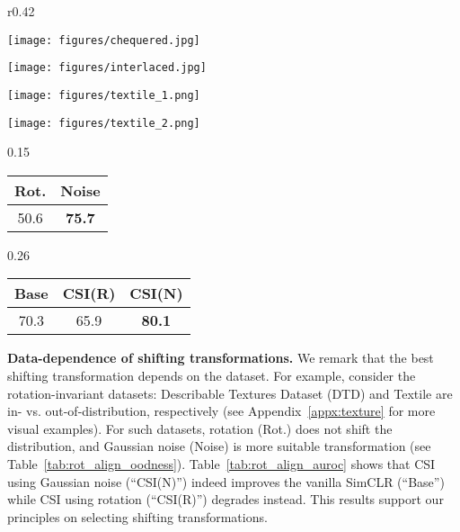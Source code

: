 \documentclass{article}
\begin{document}
\begin{wraptable}[11]{r}{0.42\textwidth}
\vspace{-0.18in}
\centering\small
\caption{OOD-ness (\%) and AUROC (\%) on DTD, where Textile is used for OOD.}\vspace{-0.03in}
\label{tab:rot_align}
\begin{minipage}{0.1\textwidth}
\texttt{[image: figures/chequered.jpg]}
\end{minipage}
\begin{minipage}{0.1\textwidth}
\texttt{[image: figures/interlaced.jpg]}
\end{minipage}
\begin{minipage}{0.1\textwidth}
\texttt{[image: figures/textile\_1.png]}
\end{minipage}
\begin{minipage}{0.1\textwidth}
\texttt{[image: figures/textile\_2.png]}
\end{minipage}
\setlength{\tabcolsep}{5pt}\begin{subtable}{0.15\textwidth}
\centering\small
\vspace{0.08in}
\caption{OOD-ness}\label{tab:rot_align_oodness}
\vspace{-0.07in}
\begin{tabular}{cc}
\toprule
Rot. & Noise \\
\midrule
50.6 & \textbf{75.7} \\
\bottomrule
\end{tabular}
\end{subtable}
\begin{subtable}{0.26\textwidth}
\centering\small
\vspace{0.08in}
\caption{AUROC}\label{tab:rot_align_auroc}
\vspace{-0.07in}
\begin{tabular}{ccc}
\toprule
Base & CSI(R) & CSI(N) \\
\midrule
70.3 & 65.9 & \textbf{80.1} \\
\bottomrule
\end{tabular}
\end{subtable}\end{wraptable}
 
\textbf{Data-dependence of shifting transformations.}
We remark that the best shifting transformation depends on the dataset. For example, consider the rotation-invariant datasets: Describable Textures Dataset (DTD) \citep{cimpoi2014describing} and Textile \citep{schulz1996tilda} are in- vs. out-of-distribution, respectively (see Appendix~\ref{appx:texture} for more visual examples). For such datasets, rotation (Rot.) does not shift the distribution, and Gaussian noise (Noise) is more suitable transformation (see Table~\ref{tab:rot_align_oodness}). Table~\ref{tab:rot_align_auroc} shows that CSI using Gaussian noise (``CSI(N)'') indeed improves the vanilla SimCLR (``Base'') while CSI using rotation (``CSI(R)'') degrades instead. This results support our principles on selecting shifting transformations.
\end{document}
